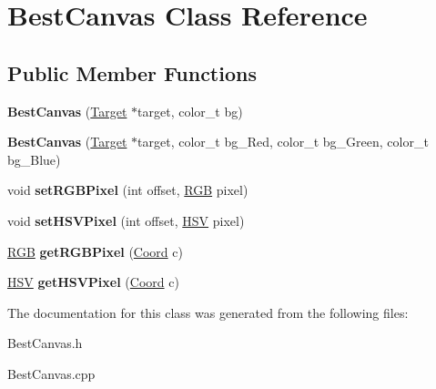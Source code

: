 \hypertarget{class_best_canvas}{\section{Best\-Canvas Class Reference}
\label{class_best_canvas}
}
\subsection*{Public Member Functions}
\begin{DoxyCompactItemize}
\item 
\hypertarget{class_best_canvas_ad182d4690d4551842643aebecc7c4855}{{\bfseries Best\-Canvas} (\hyperlink{class_target}{Target} $\ast$target, color\-\_\-t bg)}\label{class_best_canvas_ad182d4690d4551842643aebecc7c4855}

\item 
\hypertarget{class_best_canvas_a8fe1a93900c9c241d180cc4302724458}{{\bfseries Best\-Canvas} (\hyperlink{class_target}{Target} $\ast$target, color\-\_\-t bg\-\_\-\-Red, color\-\_\-t bg\-\_\-\-Green, color\-\_\-t bg\-\_\-\-Blue)}\label{class_best_canvas_a8fe1a93900c9c241d180cc4302724458}

\item 
\hypertarget{class_best_canvas_a132c5ae0ba4a64d861e0f02f4318f4cb}{void {\bfseries set\-R\-G\-B\-Pixel} (int offset, \hyperlink{struct_r_g_b}{R\-G\-B} pixel)}\label{class_best_canvas_a132c5ae0ba4a64d861e0f02f4318f4cb}

\item 
\hypertarget{class_best_canvas_a596f525da74cfb4f889ceca87a9cf4f6}{void {\bfseries set\-H\-S\-V\-Pixel} (int offset, \hyperlink{struct_h_s_v}{H\-S\-V} pixel)}\label{class_best_canvas_a596f525da74cfb4f889ceca87a9cf4f6}

\item 
\hypertarget{class_best_canvas_abd9c06a1c0304bec04a5060f31f6d9b8}{\hyperlink{struct_r_g_b}{R\-G\-B} {\bfseries get\-R\-G\-B\-Pixel} (\hyperlink{struct_coord}{Coord} c)}\label{class_best_canvas_abd9c06a1c0304bec04a5060f31f6d9b8}

\item 
\hypertarget{class_best_canvas_ae973df7ff7f90693cca4b883ccde1d59}{\hyperlink{struct_h_s_v}{H\-S\-V} {\bfseries get\-H\-S\-V\-Pixel} (\hyperlink{struct_coord}{Coord} c)}\label{class_best_canvas_ae973df7ff7f90693cca4b883ccde1d59}

\end{DoxyCompactItemize}


The documentation for this class was generated from the following files\-:\begin{DoxyCompactItemize}
\item 
Best\-Canvas.\-h\item 
Best\-Canvas.\-cpp\end{DoxyCompactItemize}
